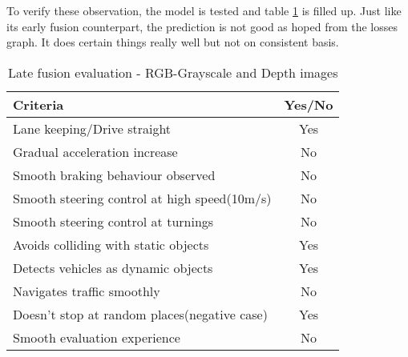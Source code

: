 To verify these observation, the model is tested and table \ref{table:latefusionrgbdepth}
is filled up. Just like its early fusion counterpart, the prediction is not good as hoped
from the losses graph. It does certain things really well but not on consistent basis.
\begin{table}[!ht]
    \centering
\begin{tabular}{lc}
    \toprule
    Criteria  & Yes/No\\\midrule
    Lane keeping/Drive straight  & Yes  \\
    Gradual acceleration increase  & No\\
    Smooth braking behaviour observed & No \\
    Smooth steering control at high speed(10m/s) & No \\
    Smooth steering control at turnings & No\\
    Avoids colliding with static objects & Yes \\
    Detects vehicles as dynamic objects & Yes \\
    Navigates traffic smoothly & No\\
    Doesn't stop at random places(negative case) & Yes \\
    Smooth evaluation experience & No \\\bottomrule
\end{tabular}
\caption{Late fusion evaluation - RGB-Grayscale and Depth images}
\label{table:latefusionrgbdepth}
\end{table}

